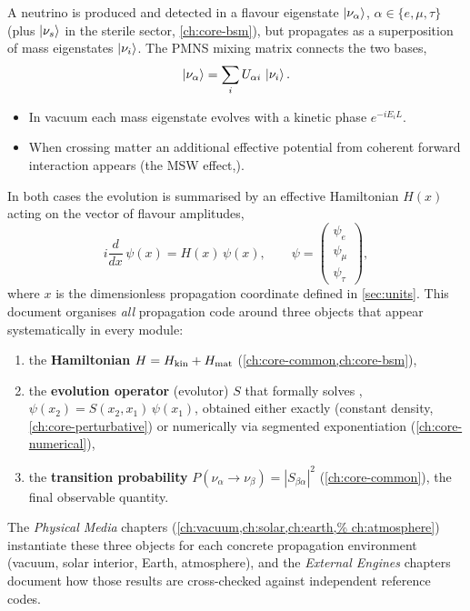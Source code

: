 A neutrino is produced and detected in a flavour eigenstate
$\ket{\nu_\alpha}$, $\alpha \in \{e,\mu,\tau\}$ (plus $\ket{\nu_s}$ in the
sterile sector, \cref{ch:core-bsm}), but propagates as a superposition of
mass eigenstates $\ket{\nu_i}$. The PMNS mixing matrix
\parencite{Pontecorvo1957,MakiNakagawaSakata1962} connects the two bases,
\begin{equation}
  \ket{\nu_\alpha} = \sum_i U_{\alpha i}\,\ket{\nu_i}.
\end{equation}
\begin{itemize}
  \item In vacuum each mass eigenstate evolves with a kinetic phase $e^{-iE_i L}$.
  \item When crossing matter an additional effective potential from coherent forward
interaction appears (the MSW effect,\parencite{Wolfenstein1978,MikheyevSmirnov1985}).
\end{itemize}
In both cases the evolution is summarised by an effective Hamiltonian $H(x)$ acting
 on the vector of flavour amplitudes,
\begin{equation}
  i \frac{d}{dx}\, \psi(x) = H(x)\, \psi(x),
  \qquad
  \psi = \begin{pmatrix}\psi_e\\ \psi_\mu\\ \psi_\tau\end{pmatrix},
  \label{eq:schrodinger-flavour}
\end{equation}
where $x$ is the dimensionless propagation coordinate defined in
\cref{sec:units}. This document organises \emph{all} propagation code around
three objects that appear systematically in every module:

\begin{enumerate}
  \item the \textbf{Hamiltonian} $H = H_{\rm kin} + H_{\rm mat}$
    (\cref{ch:core-common,ch:core-bsm}),
  \item the \textbf{evolution operator} (evolutor) $S$ that formally solves
    ,
    $\psi(x_2) = S(x_2, x_1)\,\psi(x_1)$, obtained either exactly (constant
    density, \cref{ch:core-perturbative}) or numerically via segmented
    exponentiation (\cref{ch:core-numerical}),
  \item the \textbf{transition probability}
    $P(\nu_\alpha \to \nu_\beta) = |S_{\beta\alpha}|^2$
    (\cref{ch:core-common}), the final observable quantity.
\end{enumerate}

The \emph{Physical Media} chapters (\cref{ch:vacuum,ch:solar,ch:earth,%
ch:atmosphere}) instantiate these three objects for each concrete
propagation environment (vacuum, solar interior, Earth, atmosphere), and the
\emph{External Engines} chapters document how those results are
cross-checked against independent reference codes.

